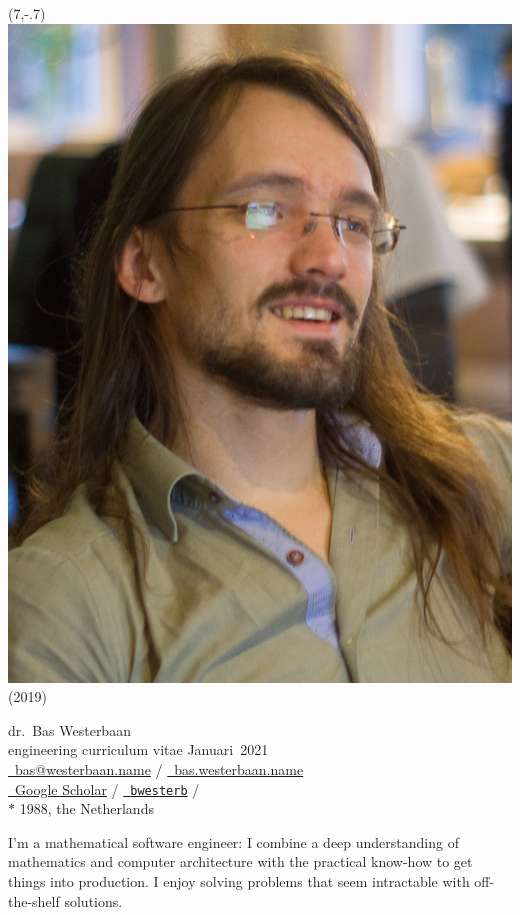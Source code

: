 \documentclass{article}
\newcommand\hsep{ {\color{gray}/} }
\begin{document}
\begin{textblock}{2}(7,-.7)
    \noindent
\includegraphics[width=\textwidth]{me}
        \footnotesize(2019)
\end{textblock}\noindent
\textsf{\Large dr.~Bas Westerbaan}\\
engineering curriculum vitae Januari~2021\\

\noindent
\href{mailto:bas@westerbaan.name}{\faEnvelopeO\ bas@westerbaan.name} \hsep
\href{https://bas.westerbaan.name}{\faExternalLink\ bas.westerbaan.name}\\
\href{https://scholar.google.nl/citations?user=AN7BEa8AAAAJ}{%
    \faGraduationCap\ Google Scholar}
    \hsep \href{https://github.com/bwesterb}{\faGithub\ \texttt{bwesterb}}
    \hsep \href{https://www.linkedin.com/in/baswesterbaan/}{\faLinkedinSquare} \\
$*$ 1988, the Netherlands

\vskip0.3cm\noindent
I'm a mathematical software engineer: I combine a deep understanding
    of mathematics and computer architecture
    with the practical know-how to get things into production.
    I enjoy solving  problems that seem intractable
        with off-the-shelf solutions.
\end{document}
